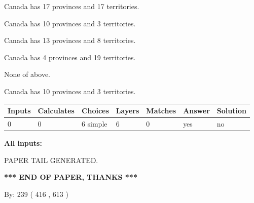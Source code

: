 \documentclass[12pt]{article}
\begin{document}
 
Canada has  17 provinces and  17 territories.
 
 
Canada has 10  provinces and 3 territories.
 
 
Canada has  13 provinces and  8 territories.
 
 
Canada has   4 provinces and  19 territories.
 
 
 None of above.
 
 
\noindent{}
 
 
Canada has 10  provinces and 3 territories.
 
 
\noindent{}
 
 
   
   
   
   
\noindent\begin{tabular}{|l|l|l|l|l|l|l|}
 \hline
Inputs & Calculates & Choices & Layers & Matches & Answer & Solution \\ \hline
 0  & 
 0  & 
 6
  simple  
  & 
 6  & 
 0  & 
  yes & 
  no 
  \\ \hline
 \end{tabular}
   
   
   
   
\noindent{}
   
   
   
   
\noindent\vspace{0.1in}\hspace{-0.08in} {\textbf{\Large{All inputs: }}}
   
   
   
   
   
   
 \vspace{0.2in}
 
   
   
\vspace{2.0in} PAPER TAIL GENERATED.
   
   
   
   
\vspace{1.0in} 
{\textbf{\large{ *** END OF PAPER, THANKS *** }}} 
   
   
\hspace{1.0in} By: 
 239 ( 416 ,  613 )
   
\end{document}
